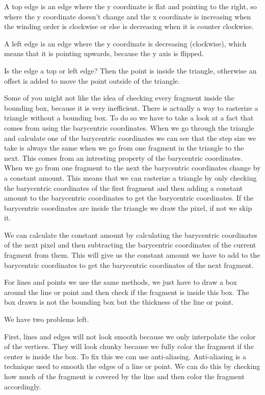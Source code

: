 \documentclass[12pt]{report} \usepackage{preamble}
\begin{document}
A top edge is an edge where the y coordinate is flat and pointing to the right,
so where the y coordinate doesn't change
and the x coordinate is increasing when the winding order is clockwise
or else is decreasing when it is counter clockwise.

A left edge is an edge where the y coordinate is decreasing (clockwise),
which means that it is pointing upwards, because the y axis is flipped.

Is the edge a top or left edge? Then the point is inside the triangle,
otherwise an offset is added to move the point outside of the triangle.

Some of you might not like the idea of checking every fragment inside the bounding box,
because it is very inefficient. There is actually a way to rasterize
a triangle without a bounding box. To do so we have to take a look at
a fact that comes from using the barycentric coordinates.
When we go through the triangle and calculate one of the barycentric coordinates
we can see that the step size we take is always the same
when we go from one fragment in the triangle to the next.
This comes from an intresting property of the barycentric coordinates.
When we go from one fragment to the next the barycentric coordinates
change by a constant amount. This means that we can rasterize a triangle by only checking
the barycentric coordinates of the first fragment and then adding a constant amount
to the barycentric coordinates to get the barycentric coordinates.
If the barycentric coordinates are inside the triangle we draw the pixel, if not we skip it.

We can calculate the constant amount by calculating the barycentric coordinates
of the next pixel and then subtracting the barycentric coordinates
of the current fragment from them. This will give us the constant amount we have to add
to the barycentric coordinates to get the barycentric coordinates of the next fragment.

For lines and points we use the same methods, we just have to draw a box
around the line or point and then check if the fragment is inside this box.
The box drawn is not the bounding box but the thickness of the line or point.

We have two problems left.

First, lines and edges will not look smooth because we only interpolate the color of the vertices.
They will look chunky because we fully color the fragment if the center is inside the box.
To fix this we can use anti-aliasing. Anti-aliasing is a technique used to
smooth the edges of a line or point. We can do this by checking how much of the fragment
is covered by the line and then color the fragment accordingly.
\end{document}
